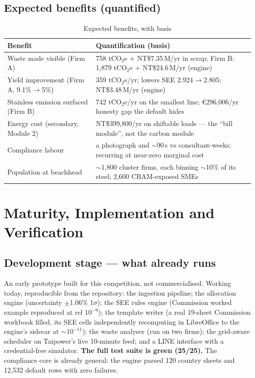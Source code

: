 \documentclass[11pt,a4paper]{article}
\newcommand{\NT}{NT\$}
\begin{document}
\subsection{Expected benefits (quantified)}
\begin{table}[htbp]
\caption{Expected benefits, with basis}
\label{tab:benefits}
\small
\begin{tabularx}{\textwidth}{@{}Xl@{}}
\toprule
\textbf{Benefit} & \textbf{Quantification (basis)} \\
\midrule
Waste made visible (Firm A) & 758 tCO$_2$e $+$ \NT7.35\,M/yr in scrap; Firm B: 1,879 tCO$_2$e $+$ \NT24.6\,M/yr (engine)\cite{repo} \\
Yield improvement (Firm A, 9.1\%$\to$5\%) & 359 tCO$_2$e/yr; lowers SEE 2.924$\to$2.805; \NT3.48\,M/yr (engine)\cite{repo} \\
Stainless emission surfaced (Firm B) & 742 tCO$_2$e/yr on the smallest line; €296,006/yr honesty gap the default hides\cite{repo} \\
Energy cost (secondary, Module 2) & \NT399,800/yr on shiftable loads --- the ``bill module'', not the carbon module\cite{repo} \\
Compliance labour & a photograph and $\sim$90\,s vs consultant-weeks; recurring at near-zero marginal cost \\
Population at beachhead & $\sim$1,800 cluster firms, each binning $\sim$10\% of its steel; 2,600 CBAM-exposed SMEs\cite{moenv} \\
\bottomrule
\end{tabularx}
\end{table}

\section{Maturity, Implementation and Verification}\label{sec:maturity}

\subsection{Development stage --- what already runs}
An early prototype built for this competition, not commercialised. Working today, reproducible from the repository: the ingestion pipeline; the allocation engine (uncertainty $\pm$1.06\% 1$\sigma$); the SEE rules engine (Commission worked example reproduced at rel $10^{-9}$); the template writer (a real 19-sheet Commission workbook filled, its SEE cells independently recomputing in LibreOffice to the engine's sidecar at $\sim$$10^{-11}$); the waste analyser (run on two firms); the grid-aware scheduler on Taipower's live 10-minute feed; and a LINE interface with a credential-free simulator. \textbf{The full test suite is green (25/25).}\cite{repo} The compliance core is already general: the engine parsed 120 country sheets and 12{,}532 default rows with zero failures\cite{repo}.
\end{document}
